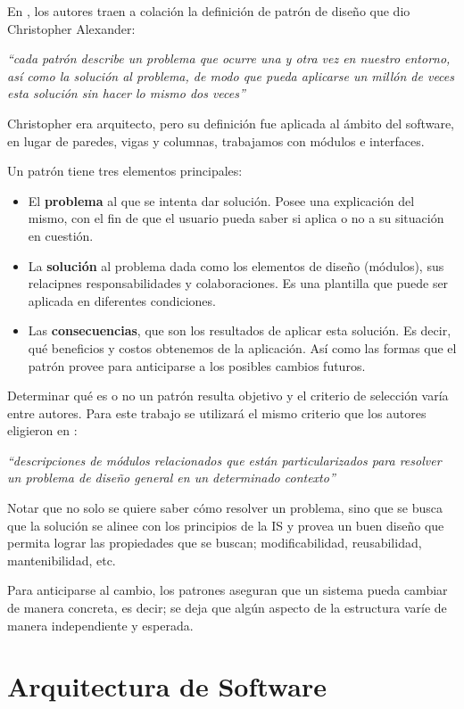 En \cite{Gamma:1995:DPE:186897}, los autores traen a colación la definición de patrón de diseño que dio Christopher Alexander:

\textit{``cada patrón describe un problema que ocurre una y otra vez en nuestro entorno, así como la solución al problema, de modo que pueda aplicarse un millón de veces esta solución sin hacer lo mismo dos veces''}

Christopher era arquitecto, pero su definición fue aplicada al ámbito del software, en lugar de paredes, vigas y columnas, trabajamos con módulos e interfaces.

Un patrón tiene tres elementos principales:

\begin{itemize}
	\item El \textbf{problema} al que se intenta dar solución. Posee una explicación del mismo, con el fin de que el usuario pueda saber si aplica o no a su situación en cuestión.
	\item La \textbf{solución} al problema dada como los elementos de diseño (módulos), sus relacipnes responsabilidades y colaboraciones. Es una plantilla que puede ser aplicada en diferentes condiciones.
	\item Las \textbf{consecuencias}, que son los resultados de aplicar esta solución. Es decir, qué beneficios y costos obtenemos de la aplicación. Así como las formas que el patrón provee para anticiparse a los posibles cambios futuros.
\end{itemize}

Determinar qué es o no un patrón resulta objetivo y el criterio de selección varía entre autores. Para este trabajo se utilizará el mismo criterio que los autores eligieron en \cite{Gamma:1995:DPE:186897}:

\textit{``descripciones de módulos relacionados que están particularizados para resolver un problema de diseño general en un determinado contexto''}

Notar que no solo se quiere saber cómo resolver un problema, sino que se busca que la solución se alinee con los principios de la \gls{IS} y provea un buen diseño que permita lograr las propiedades que se buscan; modificabilidad, reusabilidad, mantenibilidad, etc.

Para anticiparse al cambio, los patrones aseguran que un sistema pueda cambiar de manera concreta, es decir; se deja que algún aspecto de la estructura varíe de manera independiente y esperada.


\section{Arquitectura de Software}
\label{secArq}

